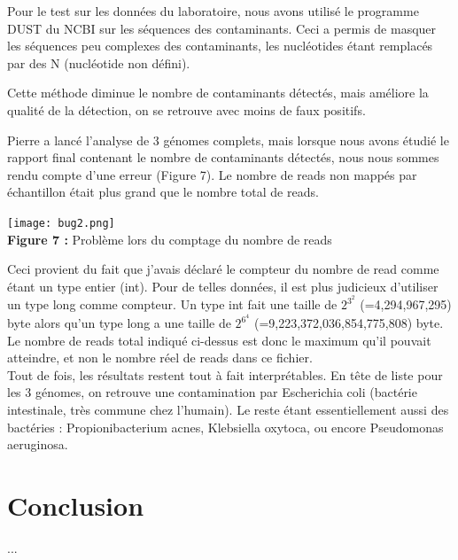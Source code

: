 \documentclass[a4paper,12pt]{article}
\begin{document}
Pour le test sur les données du laboratoire, nous avons utilisé le programme DUST du NCBI sur les séquences des contaminants. Ceci a permis de masquer les séquences peu complexes des contaminants, les nucléotides étant remplacés par des N (nucléotide non défini).

Cette méthode diminue le nombre de contaminants détectés, mais améliore la qualité de la détection, on se retrouve avec moins de faux positifs. 

Pierre a lancé l'analyse de 3 génomes complets, mais lorsque nous avons étudié le rapport final contenant le nombre de contaminants détectés, nous nous sommes rendu compte d'une erreur (Figure 7). Le nombre de reads non mappés par échantillon était plus grand que le nombre total de reads. 
\begin{center}
 \texttt{[image: bug2.png]}~\\
 \textbf{Figure 7 :} Problème lors du comptage du nombre de reads
 \end{center}
Ceci provient du fait que j'avais déclaré le compteur du nombre de read comme étant un type entier (int). Pour de telles données, il est plus judicieux d'utiliser un type long comme compteur. Un type int fait une taille de $2^3^2$ (=4,294,967,295) byte alors qu'un type long a une taille de $2^6^4$ (=9,223,372,036,854,775,808) byte. Le nombre de reads total indiqué ci-dessus est donc le maximum qu'il pouvait atteindre, et non le nombre réel de reads dans ce fichier. \\

Tout de fois, les résultats restent tout à fait interprétables. En tête de liste pour les 3 génomes, on retrouve une contamination par Escherichia coli (bactérie intestinale, très commune chez l'humain). Le reste étant essentiellement aussi des bactéries : Propionibacterium acnes, Klebsiella oxytoca, ou encore Pseudomonas aeruginosa. 

\clearpage
\section{Conclusion}
...\\
 
\clearpage


\end{document}
